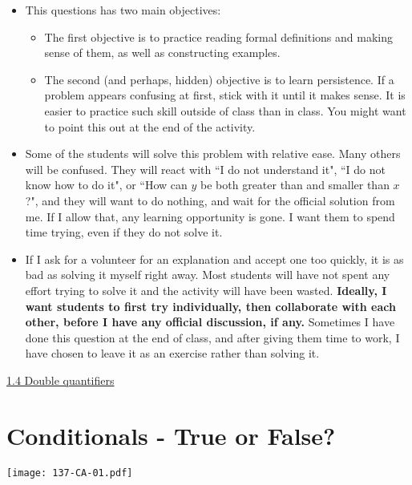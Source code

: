 \documentclass[11pt]{article}
\newcommand{\n}{\newpage}
\newcommand{\nl}{\hfill \vspace{-1.1\baselineskip}} %
\newcommand{\vfour}{\hspace{8mm}\href{https://www.youtube.com/watch?v=h1milgIk4U8&list=PLlwePzQY_wW-CPzhk-af-MXj9knthD1gx&index=4}{1.4 Double quantifiers}}
\begin{document}
\begin{comments}
\nl
\begin{itemize}
	\item     This questions has two main objectives:
		\begin{itemize}
		\item The first objective is to practice reading formal definitions and making sense of them, as well as constructing examples.  
		\item The second (and perhaps, hidden) objective  is to learn persistence.  If a problem appears confusing at first, stick with it until it makes sense.  It is easier to practice such skill outside of class than in class. You might want to point this out at the end of the activity.
		\end{itemize}
		\item  Some of the students will solve this problem with relative ease.  Many others will be confused.  They will react with ``I do not understand it", ``I do not know how to do it", or ``How can $y$ be both greater than and smaller than $x$?", and they will want to do nothing, and wait for the official solution from me.  If I allow that, any learning opportunity is gone.   I want them to spend time trying, even if they do not solve it.
	\item  If I ask for a volunteer for an explanation and accept one too quickly, it is as bad as solving it myself right away.  Most students will have not spent any effort trying to solve it and the activity will have been wasted.  \textbf{Ideally, I want students to first try  individually, then collaborate with each other, before I have any official discussion, if any. }  Sometimes I have done this question at the end of class, and after giving them time to work, I have chosen to leave it as an exercise rather than solving it.
\end{itemize}
\end{comments}

\begin{videos}
\vfour
\end{videos}

\n
\newpage
\section{Conditionals - True or False?} 

\begin{center}
{ \texttt{[image: 137-CA-01.pdf]}}
\end{center}
\end{document}
